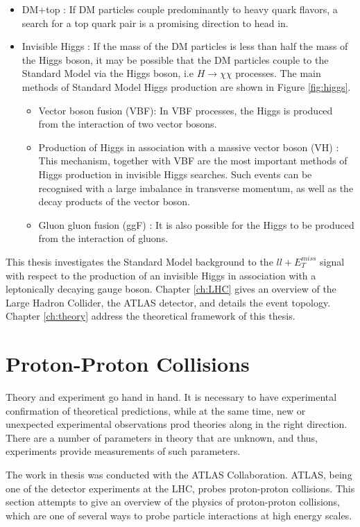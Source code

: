 \documentclass[11pt,a4paper,openright,twoside]{report}
\newcommand{\met}{$E_T^{miss}$ }
\begin{document}
\begin{itemize}
\item DM+top : If DM particles couple predominantly to heavy quark flavors, a search for a top quark pair is a promising direction to head in.
\item Invisible Higgs :  If the mass of the DM particles is less than half the mass of the Higgs boson, it may be possible that the DM particles couple to the Standard Model via the Higgs boson, i.e $H\to\chi\chi$ processes. The main methods of Standard Model Higgs production are shown in Figure \ref{fig:higgs}.
	\begin{itemize}
	\item Vector boson fusion (VBF): In VBF processes, the Higgs is produced from the interaction of two vector bosons.
	\item Production of Higgs in association with a massive vector boson (VH) : This mechanism, together with VBF are the most important methods of Higgs production in invisible Higgs searches. Such events can be recognised with a large imbalance in transverse momentum, as well as the decay products of the vector boson.
	\item Gluon gluon fusion (ggF) : It is also possible for the Higgs to be produced from the interaction of gluons.
	\end{itemize}
\end{itemize}

This thesis investigates the Standard Model background to the $ll+$\met signal with respect to the production of an invisible Higgs in association with a leptonically decaying gauge boson. Chapter \ref{ch:LHC} gives an overview of the Large Hadron Collider, the ATLAS detector, and details the event topology. Chapter \ref{ch:theory} address the theoretical framework of this thesis.

\section{Proton-Proton Collisions}
Theory and experiment go hand in hand. It is necessary to have experimental confirmation of theoretical predictions, while at the same time, new or unexpected experimental observations prod theories along in the right direction. There are a number of parameters in theory that are unknown, and thus, experiments provide measurements of such parameters. 

The work in thesis was conducted with the ATLAS Collaboration. ATLAS, being one of the detector experiments at the LHC, probes proton-proton collisions. This section attempts to give an overview of the physics of proton-proton collisions, which are one of several ways to probe particle interactions at high energy scales.
\end{document}
